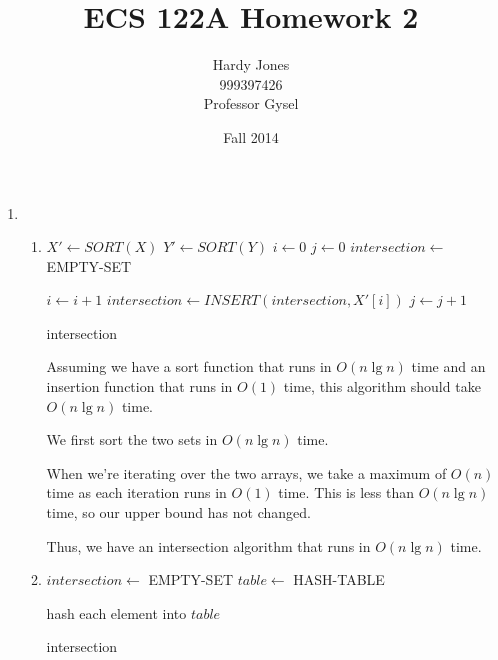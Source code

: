 \documentclass[12pt,letterpaper]{article}
\title{ECS 122A Homework 2\vspace{-2ex}}
\author{Hardy Jones\\
        999397426\\
        Professor Gysel\vspace{-2ex}}
\date{Fall 2014}
\begin{document}
  \maketitle

  \begin{enumerate}
    \item
      \begin{enumerate}
        \item
          \begin{algorithmic}
              \State $X' \gets SORT(X)$
              \State $Y' \gets SORT(Y)$
              \State $i \gets 0$
              \State $j \gets 0$
              \State $intersection \gets$ EMPTY-SET

                  \State $i \gets i + 1$
                  \State $intersection \gets INSERT(intersection, X'[i])$
                  \State $j \gets j + 1$
                \EndIf
              \EndWhile

              \Return intersection

            \EndFunction
          \end{algorithmic}

          Assuming we have a sort function that runs in $O(n \lg n)$ time
          and an insertion function that runs in $O(1)$ time,
          this algorithm should take $O(n \lg n)$ time.

          We first sort the two sets in $O(n \lg n)$ time.

          When we're iterating over the two arrays, we take a maximum of $O(n)$ time
          as each iteration runs in $O(1)$ time.
          This is less than $O(n \lg n)$ time, so our upper bound has not changed.

          Thus, we have an intersection algorithm that runs in $O(n \lg n)$ time.

        \item
          \begin{algorithmic}
              \State $intersection \gets$ EMPTY-SET
              \State $table \gets$ HASH-TABLE

                \State hash each element into $table$
              \EndFor

              \Return intersection

            \EndFunction
          \end{algorithmic}
      \end{enumerate}
  \end{enumerate}
\end{document}
